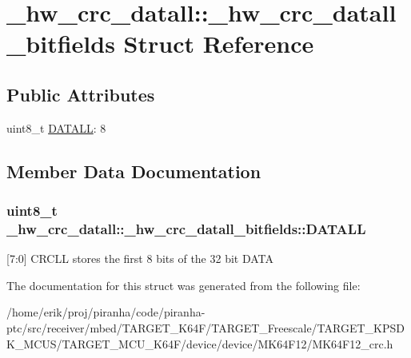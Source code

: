 \hypertarget{struct__hw__crc__datall_1_1__hw__crc__datall__bitfields}{}\section{\+\_\+hw\+\_\+crc\+\_\+datall\+:\+:\+\_\+hw\+\_\+crc\+\_\+datall\+\_\+bitfields Struct Reference}
\label{struct__hw__crc__datall_1_1__hw__crc__datall__bitfields}
\subsection*{Public Attributes}
\begin{DoxyCompactItemize}
\item 
uint8\+\_\+t \hyperlink{struct__hw__crc__datall_1_1__hw__crc__datall__bitfields_ab080119adf3911e5d8204b449660714d}{D\+A\+T\+A\+LL}\+: 8
\end{DoxyCompactItemize}


\subsection{Member Data Documentation}
\subsubsection[{\texorpdfstring{D\+A\+T\+A\+LL}{DATALL}}]{\setlength{\rightskip}{0pt plus 5cm}uint8\+\_\+t \+\_\+hw\+\_\+crc\+\_\+datall\+::\+\_\+hw\+\_\+crc\+\_\+datall\+\_\+bitfields\+::\+D\+A\+T\+A\+LL}\hypertarget{struct__hw__crc__datall_1_1__hw__crc__datall__bitfields_ab080119adf3911e5d8204b449660714d}{}\label{struct__hw__crc__datall_1_1__hw__crc__datall__bitfields_ab080119adf3911e5d8204b449660714d}
\mbox{[}7\+:0\mbox{]} C\+R\+C\+LL stores the first 8 bits of the 32 bit D\+A\+TA 

The documentation for this struct was generated from the following file\+:\begin{DoxyCompactItemize}
\item 
/home/erik/proj/piranha/code/piranha-\/ptc/src/receiver/mbed/\+T\+A\+R\+G\+E\+T\+\_\+\+K64\+F/\+T\+A\+R\+G\+E\+T\+\_\+\+Freescale/\+T\+A\+R\+G\+E\+T\+\_\+\+K\+P\+S\+D\+K\+\_\+\+M\+C\+U\+S/\+T\+A\+R\+G\+E\+T\+\_\+\+M\+C\+U\+\_\+\+K64\+F/device/device/\+M\+K64\+F12/M\+K64\+F12\+\_\+crc.\+h\end{DoxyCompactItemize}

